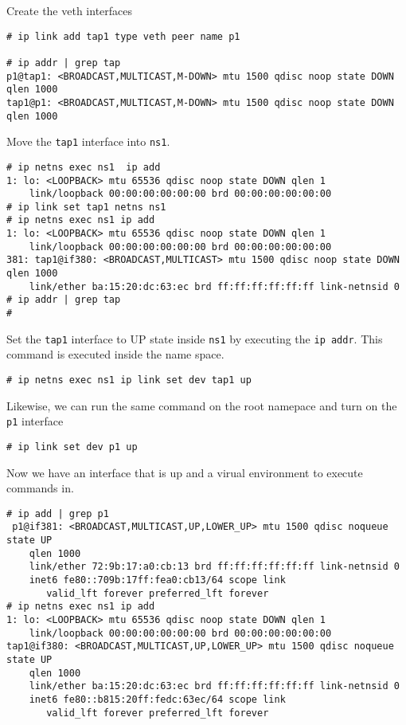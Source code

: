 \documentclass[letter]{article}
\begin{document}
{{\begin{appendices}
{Create the veth interfaces
\begin{lstlisting}
# ip link add tap1 type veth peer name p1

# ip addr | grep tap
p1@tap1: <BROADCAST,MULTICAST,M-DOWN> mtu 1500 qdisc noop state DOWN qlen 1000
tap1@p1: <BROADCAST,MULTICAST,M-DOWN> mtu 1500 qdisc noop state DOWN qlen 1000
\end{lstlisting}

Move the \texttt{tap1} interface into \texttt{ns1}.

\begin{lstlisting}
# ip netns exec ns1  ip add
1: lo: <LOOPBACK> mtu 65536 qdisc noop state DOWN qlen 1
    link/loopback 00:00:00:00:00:00 brd 00:00:00:00:00:00
# ip link set tap1 netns ns1
# ip netns exec ns1 ip add
1: lo: <LOOPBACK> mtu 65536 qdisc noop state DOWN qlen 1
    link/loopback 00:00:00:00:00:00 brd 00:00:00:00:00:00
381: tap1@if380: <BROADCAST,MULTICAST> mtu 1500 qdisc noop state DOWN qlen 1000
    link/ether ba:15:20:dc:63:ec brd ff:ff:ff:ff:ff:ff link-netnsid 0
# ip addr | grep tap
#
\end{lstlisting}

Set the \texttt{tap1} interface to UP state inside \texttt{ns1} by executing the \texttt{ip addr}. This command is executed inside the name space.

\begin{lstlisting}
# ip netns exec ns1 ip link set dev tap1 up
\end{lstlisting}

Likewise, we can run the same command on the root namepace and turn on the \texttt{p1} interface
\begin{lstlisting}
# ip link set dev p1 up
\end{lstlisting}

Now we have an interface that is up and a virual environment to execute commands in.

\begin{lstlisting}
# ip add | grep p1
 p1@if381: <BROADCAST,MULTICAST,UP,LOWER_UP> mtu 1500 qdisc noqueue state UP 
	qlen 1000
    link/ether 72:9b:17:a0:cb:13 brd ff:ff:ff:ff:ff:ff link-netnsid 0
    inet6 fe80::709b:17ff:fea0:cb13/64 scope link 
       valid_lft forever preferred_lft forever
# ip netns exec ns1 ip add
1: lo: <LOOPBACK> mtu 65536 qdisc noop state DOWN qlen 1
    link/loopback 00:00:00:00:00:00 brd 00:00:00:00:00:00
tap1@if380: <BROADCAST,MULTICAST,UP,LOWER_UP> mtu 1500 qdisc noqueue state UP 
	qlen 1000
    link/ether ba:15:20:dc:63:ec brd ff:ff:ff:ff:ff:ff link-netnsid 0
    inet6 fe80::b815:20ff:fedc:63ec/64 scope link 
       valid_lft forever preferred_lft forever
\end{lstlisting}

}
\end{appendices}}}
\end{document}

